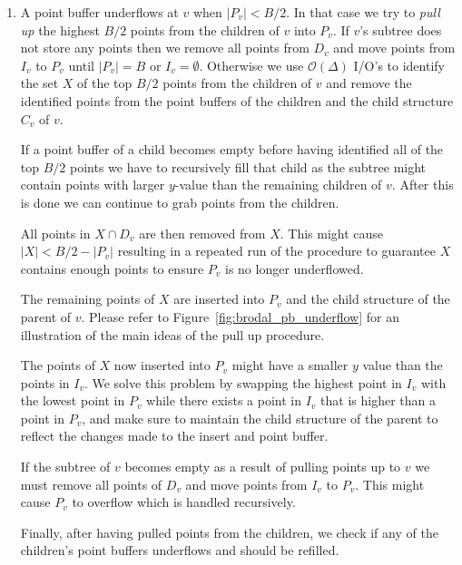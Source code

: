 \documentclass[twoside,11pt,openright]{report}
\begin{document}
\begin{enumerate}[label=(\roman*)]
	\item\label{update:pbu} A point buffer underflows at $v$ when $\vert P_v \vert < B/2$. In that case we try to \textit{pull up} the highest $B/2$ points from the children of $v$ into $P_v$. If $v$'s subtree does not store any points then we remove all points from $D_v$ and move points from $I_v$ to $P_v$ until $\vert P_v \vert = B$ or $I_v = \emptyset$.
	Otherwise we use $\mathcal{O}(\Delta)$ I/O's to identify the set $X$ of the top $B/2$ points from the children of $v$ and remove the identified points from the point buffers of the children and the child structure $C_v$ of $v$.

	If a point buffer of a child becomes empty before having identified all of the top $B/2$ points we have to recursively fill that child as the subtree might contain points with larger $y$-value than the remaining children of $v$. After this is done we can continue to grab points from the children.
	
	All points in $X \cap D_v$ are then removed from $X$. This might cause $\lvert X \rvert < B/2 - \lvert P_v \rvert$ resulting in a repeated run of the procedure to guarantee $X$ contains enough points to ensure $P_v$ is no longer underflowed.
	
	The remaining points of $X$ are inserted into $P_v$ and the child structure of the parent of $v$. Please refer to Figure~\ref{fig:brodal_pb_underflow} for an illustration of the main ideas of the pull up procedure.
	

	
	The points of $X$ now inserted into $P_v$ might have a smaller $y$ value than the points in $I_v$. We solve this problem by swapping the highest point in $I_v$ with the lowest point in $P_v$ while there exists a point in $I_v$ that is higher than a point in $P_v$, and make sure to maintain the child structure of the parent to reflect the changes made to the insert and point buffer.
	
	If the subtree of $v$ becomes empty as a result of pulling points up to $v$ we must remove all points of $D_v$ and move points from $I_v$ to $P_v$. This might cause $P_v$ to overflow which is handled recursively.
	
	Finally, after having pulled points from the children, we check if any of the children's point buffers underflows and should be refilled.
	

\end{enumerate}
\end{document}
